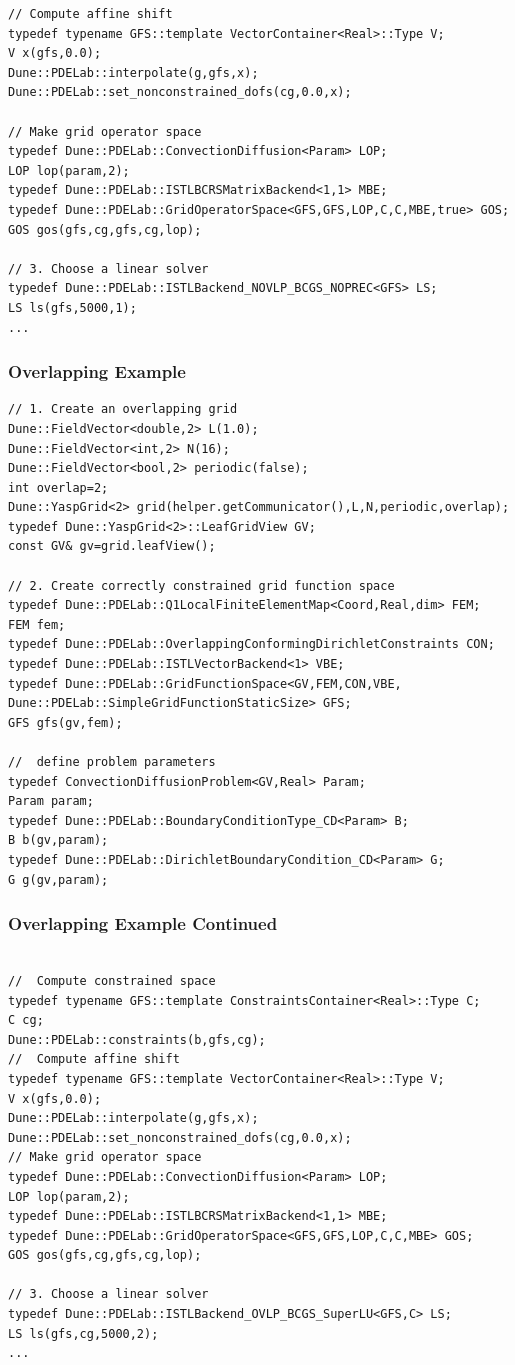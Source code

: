 {\begin{frame}[fragile]
\begin{lstlisting}[basicstyle=\tiny]
// Compute affine shift
typedef typename GFS::template VectorContainer<Real>::Type V;
V x(gfs,0.0);
Dune::PDELab::interpolate(g,gfs,x);
Dune::PDELab::set_nonconstrained_dofs(cg,0.0,x);

// Make grid operator space
typedef Dune::PDELab::ConvectionDiffusion<Param> LOP; 
LOP lop(param,2);
typedef Dune::PDELab::ISTLBCRSMatrixBackend<1,1> MBE;
typedef Dune::PDELab::GridOperatorSpace<GFS,GFS,LOP,C,C,MBE,true> GOS;
GOS gos(gfs,cg,gfs,cg,lop);

// 3. Choose a linear solver 
typedef Dune::PDELab::ISTLBackend_NOVLP_BCGS_NOPREC<GFS> LS;
LS ls(gfs,5000,1);
...
\end{lstlisting}
  
\end{frame}

\begin{frame}[fragile]
  \frametitle{Overlapping Example}
  \begin{lstlisting}[basicstyle=\tiny]
// 1. Create an overlapping grid
Dune::FieldVector<double,2> L(1.0);
Dune::FieldVector<int,2> N(16);
Dune::FieldVector<bool,2> periodic(false);
int overlap=2; 
Dune::YaspGrid<2> grid(helper.getCommunicator(),L,N,periodic,overlap);
typedef Dune::YaspGrid<2>::LeafGridView GV;
const GV& gv=grid.leafView();

// 2. Create correctly constrained grid function space
typedef Dune::PDELab::Q1LocalFiniteElementMap<Coord,Real,dim> FEM;
FEM fem;
typedef Dune::PDELab::OverlappingConformingDirichletConstraints CON;
typedef Dune::PDELab::ISTLVectorBackend<1> VBE;
typedef Dune::PDELab::GridFunctionSpace<GV,FEM,CON,VBE,
Dune::PDELab::SimpleGridFunctionStaticSize> GFS;
GFS gfs(gv,fem);

//  define problem parameters
typedef ConvectionDiffusionProblem<GV,Real> Param;
Param param;
typedef Dune::PDELab::BoundaryConditionType_CD<Param> B;
B b(gv,param);
typedef Dune::PDELab::DirichletBoundaryCondition_CD<Param> G;
G g(gv,param);
\end{lstlisting}  
\end{frame}
\begin{frame}[fragile]
\frametitle<presentation>{Overlapping Example Continued}
  \begin{lstlisting}[basicstyle=\tiny]

//  Compute constrained space
typedef typename GFS::template ConstraintsContainer<Real>::Type C;
C cg;
Dune::PDELab::constraints(b,gfs,cg);
//  Compute affine shift
typedef typename GFS::template VectorContainer<Real>::Type V;
V x(gfs,0.0);
Dune::PDELab::interpolate(g,gfs,x);
Dune::PDELab::set_nonconstrained_dofs(cg,0.0,x);
// Make grid operator space
typedef Dune::PDELab::ConvectionDiffusion<Param> LOP; 
LOP lop(param,2);
typedef Dune::PDELab::ISTLBCRSMatrixBackend<1,1> MBE;
typedef Dune::PDELab::GridOperatorSpace<GFS,GFS,LOP,C,C,MBE> GOS;
GOS gos(gfs,cg,gfs,cg,lop);

// 3. Choose a linear solver 
typedef Dune::PDELab::ISTLBackend_OVLP_BCGS_SuperLU<GFS,C> LS;
LS ls(gfs,cg,5000,2);
...
\end{lstlisting}
  
\end{frame}
}

\cleardoublepage


